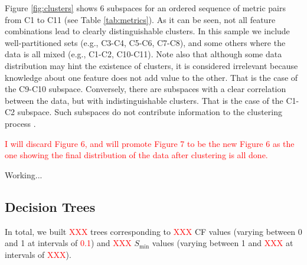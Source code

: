 Figure \ref{fig:clusters} shows 6 subspaces for an ordered sequence of metric pairs from C1 to C11 (see Table \ref{tab:metrics}). As it can be seen, not all feature combinations lead to clearly distinguishable clusters. In this sample we include well-partitioned sets (e.g., C3-C4, C5-C6, C7-C8), and some others where the data is all mixed (e.g., C1-C2, C10-C11). Note also that although some data distribution may hint the existence of clusters, it is considered irrelevant because knowledge about one feature does not add value to the other. That is the case of the C9-C10 subspace. Conversely, there are subspaces with a clear correlation between the data, but with indistinguishable clusters. That is the case of the C1-C2 subspace. Such subspaces do not contribute information to the clustering process \citep{Dy_2004_MLR}. 

\textcolor{red}{I will discard Figure 6, and will promote Figure 7 to be the new Figure 6 as the one showing the final distribution of the data after clustering is all done.}

Working...

\subsection{Decision Trees}

In total, we built \textcolor{red}{XXX} trees corresponding to \textcolor{red}{XXX} CF values (varying between 0 and 1 at intervals of \textcolor{red}{0.1}) and \textcolor{red}{XXX} $S_{\min}$ values (varying between 1 and \textcolor{red}{XXX} at intervals of \textcolor{red}{XXX}). 


% 

% 
